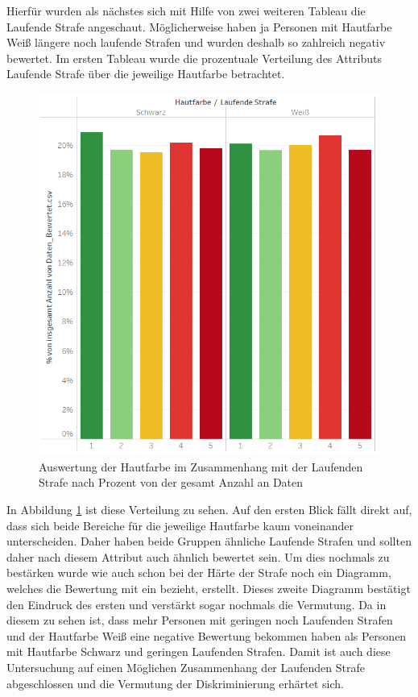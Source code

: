 \begin{onehalfspace}
Hierfür wurden als nächstes sich mit Hilfe von zwei weiteren Tableau die Laufende Strafe angeschaut. Möglicherweise haben ja Personen mit Hautfarbe Wei{\ss} längere noch laufende Strafen und wurden deshalb so zahlreich negativ bewertet. Im ersten Tableau wurde die prozentuale Verteilung des Attributs Laufende Strafe über die jeweilige Hautfarbe betrachtet.\\
\begin{figure}[h]
    \centering
    \includegraphics{Diagramme/Tab_Haut3.PNG}
    \caption{Auswertung der Hautfarbe im Zusammenhang mit der Laufenden Strafe nach Prozent von der gesamt Anzahl an Daten}
    \label{fig:TabHaut3}
\end{figure}
In Abbildung \ref{fig:TabHaut3} ist diese Verteilung zu sehen. Auf den ersten Blick fällt direkt auf, dass sich beide Bereiche für die jeweilige Hautfarbe kaum voneinander unterscheiden. Daher haben beide Gruppen ähnliche Laufende Strafen und sollten daher nach diesem Attribut auch ähnlich bewertet sein. Um dies nochmals zu bestärken wurde wie auch schon bei der Härte der Strafe noch ein Diagramm, welches die Bewertung mit ein bezieht, erstellt. Dieses zweite Diagramm bestätigt den Eindruck des ersten und verstärkt sogar nochmals die Vermutung. Da in diesem zu sehen ist, dass mehr Personen mit geringen noch Laufenden Strafen und der Hautfarbe Wei{\ss} eine negative Bewertung bekommen haben als Personen mit Hautfarbe Schwarz und geringen Laufenden Strafen. Damit ist auch diese Untersuchung auf einen Möglichen Zusammenhang der Laufenden Strafe abgeschlossen und die Vermutung der Diskriminierung erhärtet sich.\\

\end{onehalfspace}
